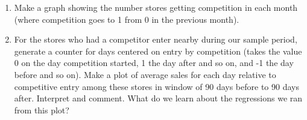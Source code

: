 \documentclass[12pt,a4paper]{article}
\begin{document}
\begin{enumerate}
\begin{enumerate}
\item Make a graph showing the number stores getting competition in each month (where competition goes to 1 from 0 in the previous month).
\item For the stores who had a competitor enter nearby during our sample period, generate a counter for days centered on entry by competition (takes the value 0 on the day competition started, 1 the day after and so on, and -1 the day before and so on). Make a plot of average sales for each day relative to competitive entry among these stores in window of 90 days before to 90 days after. Interpret and comment. What do we learn about the regressions we ran from this plot?
\end{enumerate}
\end{enumerate}

%
%
\end{document}
